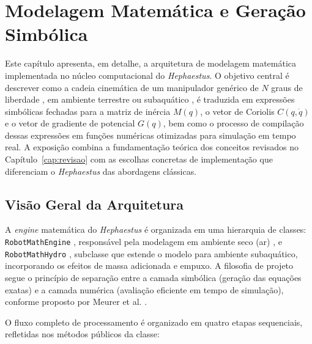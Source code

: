 \chapter{Modelagem Matemática e Geração Simbólica}
\label{cap:modelagem}

Este capítulo apresenta, em detalhe, a arquitetura de modelagem matemática implementada no núcleo computacional do \textit{Hephaestus}. O objetivo central é descrever como a cadeia cinemática de um manipulador genérico de $N$ graus de liberdade , em ambiente terrestre ou subaquático , é traduzida em expressões simbólicas fechadas para a matriz de inércia $M(q)$, o vetor de Coriolis $C(q,\dot{q})$ e o vetor de gradiente de potencial $G(q)$, bem como o processo de compilação dessas expressões em funções numéricas otimizadas para simulação em tempo real. A exposição combina a fundamentação teórica dos conceitos revisados no Capítulo~\ref{cap:revisao} com as escolhas concretas de implementação que diferenciam o \textit{Hephaestus} das abordagens clássicas.

\section{Visão Geral da Arquitetura}

A \textit{engine} matemática do \textit{Hephaestus} é organizada em uma hierarquia de classes: \texttt{RobotMathEngine} , responsável pela modelagem em ambiente seco (ar) , e \texttt{RobotMathHydro} , subclasse que estende o modelo para ambiente subaquático, incorporando os efeitos de massa adicionada e empuxo. A filosofia de projeto segue o princípio de separação entre a camada simbólica (geração das equações exatas) e a camada numérica (avaliação eficiente em tempo de simulação), conforme proposto por Meurer et al. \cite{meurer2017sympy}.

O fluxo completo de processamento é organizado em quatro etapas sequenciais, refletidas nos métodos públicos da classe:

